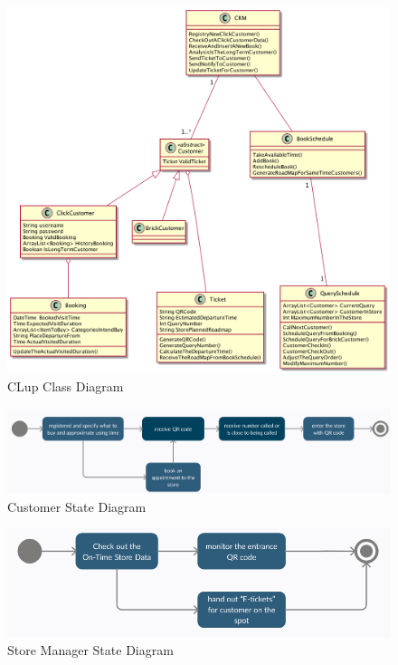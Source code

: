 \documentclass[a4paper,12pt]{book}
\begin{document}
\begin{figure}[H]
	\centering
	\includegraphics[scale=0.28]{class_diagram.png}
	\caption{CLup Class Diagram}
	\label{Class Diagram}
\end{figure}

\begin{figure}[H]   
	\includegraphics[scale=0.3]{State_diagram1.png}
	\caption{Customer State Diagram}
	\centering
	\label{State Diagram 1}
\end{figure}

\begin{figure}[H] 
	\includegraphics[scale=0.3]{State_diagram2.png}
	\caption{Store Manager State Diagram}
	\centering
	\label{State Diagram 2}
\end{figure}
\end{document}
